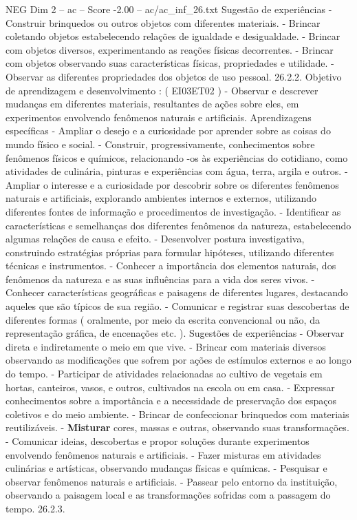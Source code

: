 \begin{textsample}{NEG Dim 2 – ac – Score -2.00 – ac/ac\_inf\_26.txt}
Sugestão de experiências - Construir brinquedos ou outros objetos com diferentes materiais. - Brincar coletando objetos estabelecendo relações de igualdade e desigualdade. - Brincar com objetos diversos, experimentando as reações físicas decorrentes. - Brincar com objetos observando suas características físicas, propriedades e utilidade. - Observar as diferentes propriedades dos objetos de uso pessoal. 26.2.2.
Objetivo de aprendizagem e desenvolvimento : ( EI03ET02 ) - Observar e descrever mudanças em diferentes materiais, resultantes de ações sobre eles, em experimentos envolvendo fenômenos naturais e artificiais.
Aprendizagens específicas - Ampliar o desejo e a curiosidade por aprender sobre as coisas do mundo físico e social. - Construir, progressivamente, conhecimentos sobre fenômenos físicos e químicos, relacionando -os às experiências do cotidiano, como atividades de culinária, pinturas e experiências com água, terra, argila e outros. - Ampliar o interesse e a curiosidade por descobrir sobre os diferentes fenômenos naturais e artificiais, explorando ambientes internos e externos, utilizando diferentes fontes de informação e procedimentos de investigação. - Identificar as características e semelhanças dos diferentes fenômenos da natureza, estabelecendo algumas relações de causa e efeito. - Desenvolver postura investigativa, construindo estratégias próprias para formular hipóteses, utilizando diferentes técnicas e instrumentos. - Conhecer a importância dos elementos naturais, dos fenômenos da natureza e as suas influências para a vida dos seres vivos. - Conhecer características geográficas e paisagens de diferentes lugares, destacando aqueles que são típicos de sua região. - Comunicar e registrar suas descobertas de diferentes formas ( oralmente, por meio da escrita convencional ou não, da representação gráfica, de encenações etc. ).
Sugestões de experiências - Observar direta e indiretamente o meio em que vive. - Brincar com materiais diversos observando as modificações que sofrem por ações de estímulos externos e ao longo do tempo. - Participar de atividades relacionadas ao cultivo de vegetais em hortas, canteiros, vasos, e outros, cultivados na escola ou em casa. - Expressar conhecimentos sobre a importância e a necessidade de preservação dos espaços coletivos e do meio ambiente. - Brincar de confeccionar brinquedos com materiais reutilizáveis. - \textbf{Misturar} cores, massas e outras, observando suas transformações. - Comunicar ideias, descobertas e propor soluções durante experimentos envolvendo fenômenos naturais e artificiais. - Fazer misturas em atividades culinárias e artísticas, observando mudanças físicas e químicas. - Pesquisar e observar fenômenos naturais e artificiais. - Passear pelo entorno da instituição, observando a paisagem local e as transformações sofridas com a passagem do tempo. 26.2.3.

\end{textsample}
